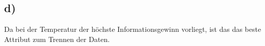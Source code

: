 \documentclass[a4paper, 11pt]{article}
\begin{document}
\FloatBarrier

\subsection*{d)}
Da bei der Temperatur der höchste Informationsgewinn vorliegt, ist das das beste Attribut zum Trennen der Daten.
\end{document}

